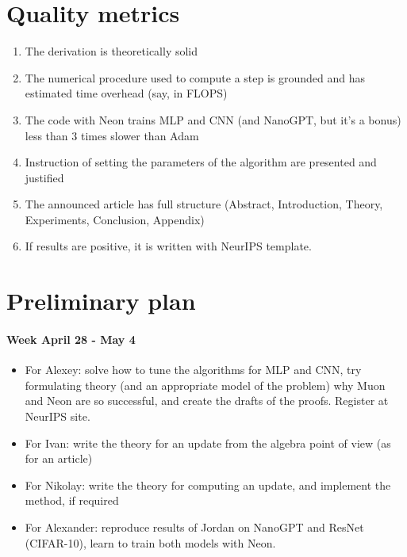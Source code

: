 \documentclass[]{scrartcl}
\begin{document}
\section{Quality metrics}
\begin{enumerate}
    \item The derivation is theoretically solid
    \item The numerical procedure used to compute a step is grounded and has estimated time overhead (say, in FLOPS)
    \item The code with Neon trains MLP and CNN (and NanoGPT, but it's a bonus) less than 3 times slower than Adam
    \item Instruction of setting the parameters of the algorithm are presented and justified
    \item The announced article has full structure (Abstract, Introduction, Theory, Experiments, Conclusion, Appendix)
    \item If results are positive, it is written with NeurIPS template.
\end{enumerate}

\section{Preliminary plan}
\paragraph{Week April 28 - May 4}
\begin{itemize}
    \item For Alexey: solve how to tune the algorithms for MLP and CNN, try formulating theory (and an appropriate model of the problem) why Muon and Neon are so successful, and create the drafts of the proofs. Register at NeurIPS site.
    
    \item For Ivan: write the theory for an update from the algebra point of view (as for an article)
    
    \item For Nikolay: write the theory for computing an update, and implement the method, if required
    
    \item For Alexander: reproduce results of Jordan on NanoGPT and ResNet (CIFAR-10), learn to train both models with Neon.
\end{itemize}
\end{document}
